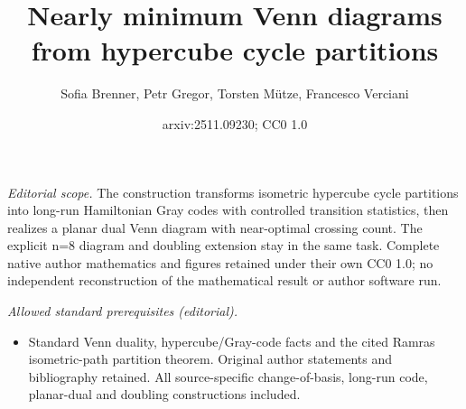 \documentclass[11pt]{article}
\title{Nearly minimum Venn diagrams from hypercube cycle partitions}
\author{Sofia Brenner, Petr Gregor, Torsten Mütze, Francesco Verciani}
\date{arxiv:2511.09230; CC0 1.0}
\begin{document}
\maketitle
\noindent\textit{Editorial scope.} The construction transforms isometric hypercube cycle partitions into long-run Hamiltonian Gray codes with controlled transition statistics, then realizes a planar dual Venn diagram with near-optimal crossing count. The explicit n=8 diagram and doubling extension stay in the same task. Complete native author mathematics and figures retained under their own CC0 1.0; no independent reconstruction of the mathematical result or author software run.\par\medskip
\noindent\textit{Allowed standard prerequisites (editorial).}\begin{itemize}
\item Standard Venn duality, hypercube/Gray-code facts and the cited Ramras isometric-path partition theorem. Original author statements and bibliography retained. All source-specific change-of-basis, long-run code, planar-dual and doubling constructions included.
\end{itemize}\medskip
\end{document}
